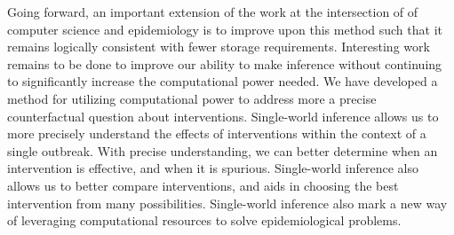 \documentclass[PTRSB]{rsos}
\begin{document}
\begin{multicols}{2}
Going forward, an important extension of the work at the intersection of of computer science and epidemiology is to improve upon this method such that it remains logically consistent with fewer storage requirements. 
Interesting work remains to be done to improve our ability to make inference without continuing to significantly increase the computational power needed.
We have developed a method for utilizing computational power to address more a precise counterfactual question about interventions. 
Single-world inference allows us to more precisely understand the effects of interventions within the context of a single outbreak. 
With precise understanding, we can better determine when an intervention is effective, and when it is spurious.
Single-world inference also allows us to better compare interventions, and aids in choosing the best intervention from many possibilities. 
Single-world inference also mark a new way of leveraging computational resources to solve epidemiological problems.

\enlargethispage{20pt}






\end{multicols}

\begin{multicols}{3}


\end{multicols}
\twocolumn
\end{document}
